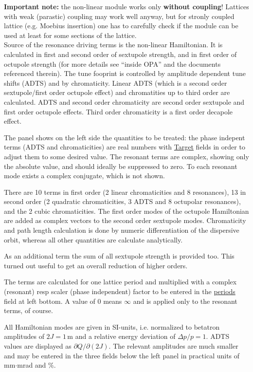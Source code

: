 \documentclass[12pt]{article}
\newcommand\field[1]{\underline{\small #1}}
\begin{document}
{\bf Important note:} the non-linear module works only {\bf without coupling}! Lattices with weak (parastic) coupling may work well anyway, but for stronly coupled lattice (e.g. Moebius insertion) one has to carefully check if the module can be used at least for some sections of the lattice.\\


Source of the resonance driving terms is the non-linear Hamiltonian. It is calculated in first and second order of sextupole strength, and in first order of octupole strength (for more details see ``inside OPA'' and the documents referenced therein). The tune fooprint is controlled by amplitude dependent tune shifts (ADTS) and by chromaticity. Linear ADTS (which is a second order sextupole/first order octupole effect) and chromatities up to third order are calculated. ADTS and second order chromaticity are second order sextupole and first order octupole effects. Third order chromaticity is a first order decapole effect.

The panel shows on the left side the quantities to be treated: the phase indepent terms (ADTS and chromaticities) are real numbers with \field{Target} fields in order to adjust them to some desired value. The resonant terms are complex, showing only the absolute value, and should ideally be suppressed to zero. To each resonant mode exists a complex conjugate, which is not shown.

There are 10 terms in first order (2 linear  chromaticities
and 8 resonances), 13 in second order (2 quadratic chromaticities, 3 ADTS and 8 octupolar resonances), and the 2 cubic chromaticities. The first order modes of the octupole Hamiltonian are added as complex vectors to the second order sextupole modes. 
Chromaticity and path length calculation
is done by numeric differentiation of the dispersive orbit, whereas all other quantities are calculate analytically.

As an additional term the sum of all sextupole strength is provided too. This turned out useful to get an overall reduction of higher orders.

The terms are calculated for one lattice period and multiplied with a complex (resonant) resp scaler (phase independent) factor to be entered in the \field{periods} field at left bottom. A value of 0 means $\infty$ and is applied only to
the resonant terms, of course.

All Hamiltonian modes are given in SI-units, i.e. normalized to betatron amplitudes of $2J=1\,$m and a relative energy deviation of $\Delta p/p=1$. ADTS values are displayed as $\partial Q/\partial (2J)$. 
The relevant amplitudes are much smaller and may be entered in the three fields below the left panel in practical units of mm$\cdot$mrad and \%.
\end{document}
